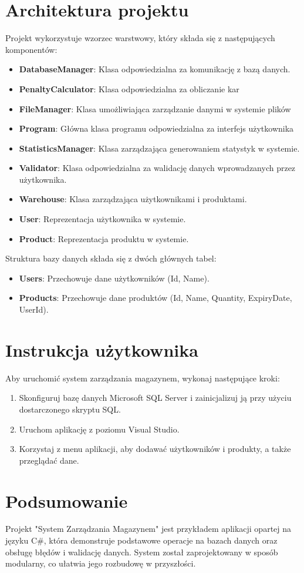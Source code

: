 \documentclass[a4paper,12pt]{article}
\begin{document}
\section{Architektura projektu}
Projekt wykorzystuje wzorzec warstwowy, który składa się z następujących komponentów:
\begin{itemize}
    \item \textbf{DatabaseManager}: Klasa odpowiedzialna za komunikację z bazą danych.
    \item \textbf{PenaltyCalculator}: Klasa odpowiedzialna za obliczanie kar
    \item \textbf{FileManager}: Klasa umożliwiająca zarządzanie danymi w systemie plików
    \item \textbf{Program}: Główna klasa programu odpowiedzialna za interfejs użytkownika
    \item \textbf{StatisticsManager}: Klasa zarządzająca generowaniem statystyk w systemie. 
    \item \textbf{Validator}: Klasa odpowiedzialna za walidację danych wprowadzanych przez użytkownika. 
    \item \textbf{Warehouse}: Klasa zarządzająca użytkownikami i produktami.
    \item \textbf{User}: Reprezentacja użytkownika w systemie.
    \item \textbf{Product}: Reprezentacja produktu w systemie.
\end{itemize}

Struktura bazy danych składa się z dwóch głównych tabel:
\begin{itemize}
    \item \textbf{Users}: Przechowuje dane użytkowników (Id, Name).
    \item \textbf{Products}: Przechowuje dane produktów (Id, Name, Quantity, ExpiryDate, UserId).
\end{itemize}

\section{Instrukcja użytkownika}
Aby uruchomić system zarządzania magazynem, wykonaj następujące kroki:
\begin{enumerate}
    \item Skonfiguruj bazę danych Microsoft SQL Server i zainicjalizuj ją przy użyciu dostarczonego skryptu SQL.
    \item Uruchom aplikację z poziomu Visual Studio.
    \item Korzystaj z menu aplikacji, aby dodawać użytkowników i produkty, a także przeglądać dane.
\end{enumerate}

\section{Podsumowanie}
Projekt "System Zarządzania Magazynem" jest przykładem aplikacji opartej na języku C\#, która demonstruje podstawowe operacje na bazach danych oraz obsługę błędów i walidację danych. System został zaprojektowany w sposób modularny, co ułatwia jego rozbudowę w przyszłości.
\end{document}
